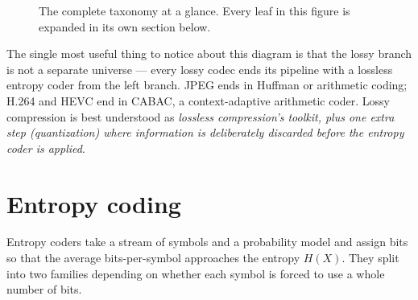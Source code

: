 \documentclass[11pt]{article}
\begin{document}
\begin{figure}[h]
\centering
{}
\caption{The complete taxonomy at a glance. Every leaf in this figure is expanded in its own section below.}
\end{figure}

The single most useful thing to notice about this diagram is that the lossy branch is not a separate universe — every lossy codec ends its pipeline with a lossless entropy coder from the left branch. JPEG ends in Huffman or arithmetic coding; H.264 and HEVC end in CABAC, a context-adaptive arithmetic coder. Lossy compression is best understood as \emph{lossless compression's toolkit, plus one extra step (quantization) where information is deliberately discarded before the entropy coder is applied}.

\section{Entropy coding}

Entropy coders take a stream of symbols and a probability model and assign bits so that the average bits-per-symbol approaches the entropy $H(X)$. They split into two families depending on whether each symbol is forced to use a whole number of bits.
\end{document}
